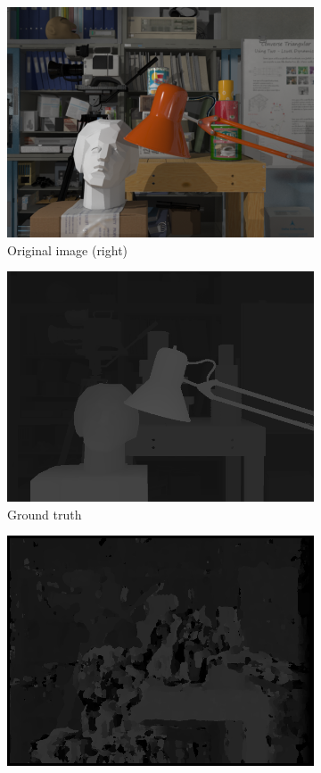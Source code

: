 \begin{figure}
\captionsetup[subfigure]{justification=centering}
\begin{subfigure}{.5\textwidth}
  \centering
  \includegraphics[width=.8\linewidth]{figures/frame_1_right}
  \caption{Original image (right)}
  \label{fig:sfig1}
\end{subfigure}
\begin{subfigure}{.5\textwidth}
  \centering
  \includegraphics[width=.8\linewidth]{figures/frame_1}
  \caption{Ground truth}
  \label{fig:sfig2}
\end{subfigure}
\begin{subfigure}{.5\textwidth}
  \centering
  \includegraphics[width=.8\linewidth]{figures/CT7D0-50}

\end{subfigure}
\end{figure}
